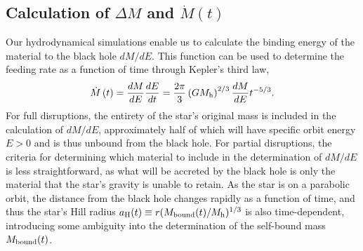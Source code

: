 \documentclass[twocolumn]{emulateapj}
\newcommand{\dmde}{dM/dE}
\newcommand{\md}{\dot{M}\left(t\right)}
\newcommand{\mh}{M_{\rm h}}
\begin{document}
\subsection{Calculation of $\Delta M$ and $\md$}\label{subsec:deltam}
Our hydrodynamical simulations enable us to calculate the binding energy of the material to the black hole $\dmde$. This function can be used to determine the feeding rate as a function of time through Kepler's third law,
\begin{equation}
\md = \frac{dM}{dE}\frac{dE}{dt} = \frac{2\pi}{3} \left(G\mh\right)^{2/3} \frac{dM}{dE} t^{-5/3}.
\end{equation}
For full disruptions, the entirety of the star's original mass is included in the calculation of $\dmde$, approximately half of which will have specific orbit energy $E > 0$ and is thus unbound from the black hole. For partial disruptions, the criteria for determining which material to include in the determination of $\dmde$ is less straightforward, as what will be accreted by the black hole is only the material that the star's gravity is unable to retain. As the star is on a parabolic orbit, the distance from the black hole changes rapidly as a function of time, and thus the star's Hill radius $a_{\rm H}(t) \equiv r (M_{\rm bound}(t)/\mh)^{1/3}$ is also time-dependent, introducing some ambiguity into the determination of the self-bound mass $M_{\rm bound}(t)$.
\end{document}
